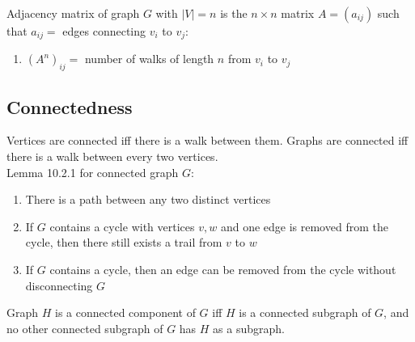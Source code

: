 \documentclass[12pt, a4paper]{article}
\begin{document}
\begin{multicols*}{3}
Adjacency matrix of graph $G$ with $|V| = n$ is the $n\times n$ matrix $A = (a_{ij})$ such that $a_{ij} =$ edges connecting $v_i$ to $v_j$:
\begin{enumerate}[\roman*.]
  \item $(A^n)_{ij} =$ number of walks of length $n$ from $v_i$ to $v_j$
\end{enumerate}
\colbreak

\subsection{Connectedness}
Vertices are connected iff there is a walk between them.
Graphs are connected iff there is a walk between every two vertices.
\\Lemma 10.2.1 for connected graph $G$:
\begin{enumerate}[\roman*.]
  \item There is a path between any two distinct vertices
  \item If $G$ contains a cycle with vertices $v, w$ and one edge is removed from the cycle, then there still exists a trail from $v$ to $w$
  \item If $G$ contains a cycle, then an edge can be removed from the cycle without disconnecting $G$
\end{enumerate}

Graph $H$ is a connected component of $G$ iff $H$ is a connected subgraph of $G$, and no other connected subgraph of $G$ has $H$ as a subgraph.


\end{multicols*}
\end{document}
